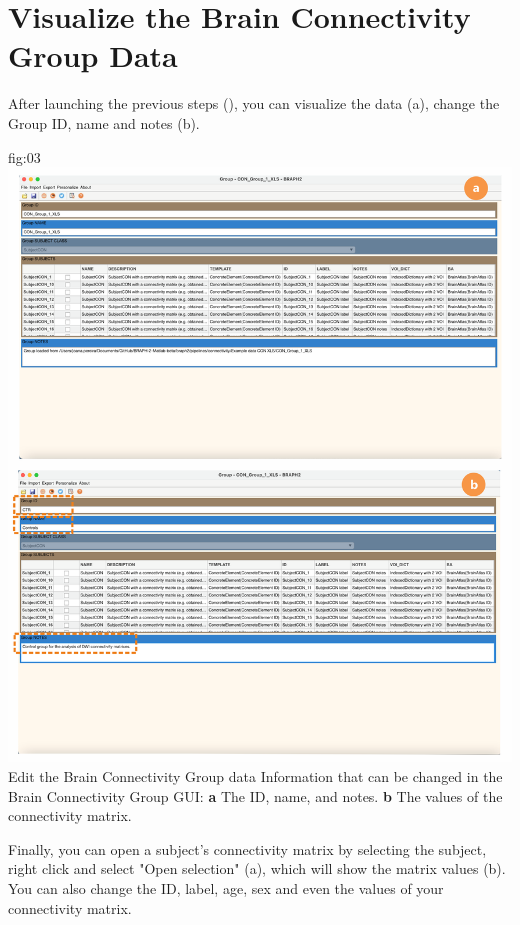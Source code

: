 \documentclass[justified]{tufte-handout}
\begin{document}
\section{Visualize the Brain Connectivity Group Data}

After launching the previous steps (), you can visualize the data (a), change the Group ID, name and notes (b). 

	{fig:03}
	{
	\includegraphics{fig03.png}
	}
	{Edit the Brain Connectivity Group data}
	{
	Information that can be changed in the Brain Connectivity Group GUI: 
	{\bf a} The ID, name, and notes.
	{\bf b} The values of the connectivity matrix.
	}

Finally, you can open a subject's connectivity matrix by selecting the subject, right click and select "Open selection" (a), which will show the matrix values (b). You can also change the ID, label, age, sex and even the values of your connectivity matrix.
\end{document}
